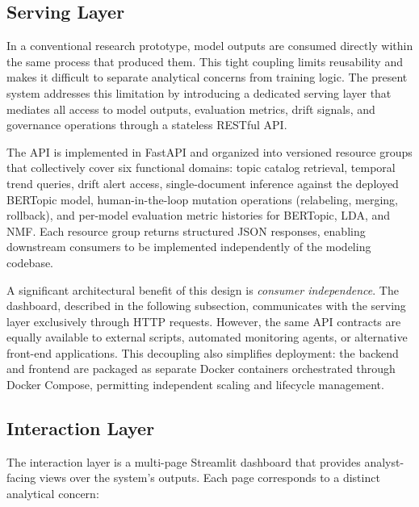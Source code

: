 \documentclass[conference]{IEEEtran}
\newcommand{\bertopic}{BERTopic\xspace}
\newcommand{\lda}{LDA\xspace}
\newcommand{\nmf}{NMF\xspace}
\begin{document}
\subsection{Serving Layer}
In a conventional research prototype, model outputs are consumed directly within the same process that produced them. This tight coupling limits reusability and makes it difficult to separate analytical concerns from training logic. The present system addresses this limitation by introducing a dedicated serving layer that mediates all access to model outputs, evaluation metrics, drift signals, and governance operations through a stateless RESTful API.

The API is implemented in FastAPI and organized into versioned resource groups that collectively cover six functional domains: topic catalog retrieval, temporal trend queries, drift alert access, single-document inference against the deployed \bertopic model, human-in-the-loop mutation operations (relabeling, merging, rollback), and per-model evaluation metric histories for \bertopic, \lda, and \nmf. Each resource group returns structured JSON responses, enabling downstream consumers to be implemented independently of the modeling codebase.

A significant architectural benefit of this design is \emph{consumer independence}. The dashboard, described in the following subsection, communicates with the serving layer exclusively through HTTP requests. However, the same API contracts are equally available to external scripts, automated monitoring agents, or alternative front-end applications. This decoupling also simplifies deployment: the backend and frontend are packaged as separate Docker containers orchestrated through Docker Compose, permitting independent scaling and lifecycle management.

\subsection{Interaction Layer}
The interaction layer is a multi-page Streamlit dashboard that provides analyst-facing views over the system's outputs. Each page corresponds to a distinct analytical concern:
\end{document}
